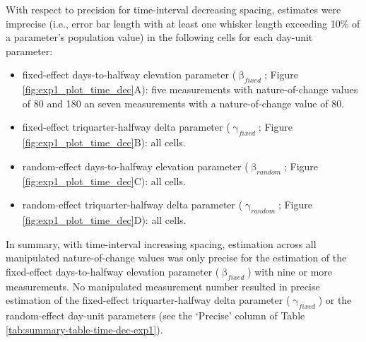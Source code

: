 \documentclass[
12pt, %
twoside,
english]{guelphthesis}
\begin{document}
With respect to precision for time-interval decreasing spacing, estimates were imprecise (i.e., error bar length with at least one whisker length exceeding 10\% of a parameter's population value) in the following cells for each day-unit parameter:
\begin{itemize}
\tightlist
\item
  fixed-effect days-to-halfway elevation parameter (\(\upbeta_{fixed}\); Figure \ref{fig:exp1_plot_time_dec}A): five measurements with nature-of-change values of 80 and 180 an seven measurements with a nature-of-change value of 80.
\item
  fixed-effect triquarter-halfway delta parameter (\(\upgamma_{fixed}\); Figure \ref{fig:exp1_plot_time_dec}B): all cells.
\item
  random-effect days-to-halfway elevation parameter (\(\upbeta_{random}\); Figure \ref{fig:exp1_plot_time_dec}C): all cells.
\item
  random-effect triquarter-halfway delta parameter (\(\upgamma_{random}\); Figure \ref{fig:exp1_plot_time_dec}D): all cells.
\end{itemize}
In summary, with time-interval increasing spacing, estimation across all manipulated nature-of-change values was only precise for the estimation of the fixed-effect days-to-halfway elevation parameter (\(\upbeta_{fixed}\)) with nine or more measurements. No manipulated measurement number resulted in precise estimation of the fixed-effect triquarter-halfway delta parameter (\(\upgamma_{fixed}\)) or the random-effect day-unit parameters (see the `Precise' column of Table \ref{tab:summary-table-time-dec-exp1}).
\end{document}
